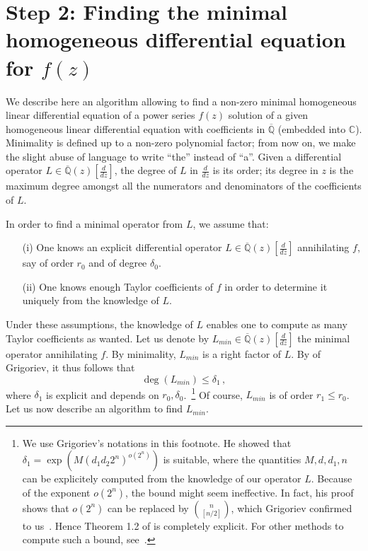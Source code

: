 \documentclass[reqno,english,12pt,a4paper]{smfart}
\numberwithin{equation}{section}
\def\Qbar{\overline{\mathbb Q}}
\begin{document}
\section{Step 2: Finding the minimal homogeneous differential equation for $f(z)$}\label{sec:s2}

We describe here an algorithm allowing to find a  non-zero minimal homogeneous linear differential equation of a 
power series $f(z)$ solution of a given homogeneous linear differential equation with coefficients in $\Qbar$ (embedded into $\mathbb C$). Minimality is defined up to a non-zero polynomial factor; from now on, we make the slight abuse of language to write ``the'' instead of ``a''. Given a differential operator $L \in \Qbar(z)[\frac{d}{dz}]$, the degree of $L$ in $\frac{d}{dz}$ is its order; its degree in $z$ is the maximum degree amongst all the numerators and denominators of the coefficients of $L$. 

In order to find a minimal operator from $L$, we assume that: 

\begin{itemize}

\item[(i)] One knows an explicit differential operator $L\in \Qbar(z)[\frac{d}{dz}]$ annihilating $f$, say 
of order $r_0$ and of degree $\delta_0$. 

\medskip

\item[(ii)] One knows enough Taylor coefficients of $f$ in order to determine it uniquely from the 
knowledge of $L$. 
\end{itemize}

Under these assumptions, the knowledge of $L$ enables one to compute as many Taylor coefficients 
as wanted.  Let us denote by $L_{min}\in \Qbar(z)[\frac{d}{dz}]$ the minimal operator annihilating $f$. 
By minimality, $L_{min}$ is a right factor of $L$.  By \cite[Theorem 1.2]{Gr90} of Grigoriev, 
it thus follows that 
$$
\deg(L_{min})\leq \delta_1 \,,
$$
where $\delta_1$ is explicit and depends on $r_0,\delta_0$.~\footnote{We use Grigoriev's notations \cite{Gr90} in this footnote. He 
showed that 
$\delta_1=\exp(M(d_1d_2 2^n)^{o(2^n)})$ is suitable, where the quantities $M, d, d_1, n$ can be explicitely computed from the knowledge of our operator $L$. Because of the exponent $o(2^n)$, the bound might seem ineffective. In fact, his proof shows that $o(2^n)$ can be replaced 
by $\binom{n}{[n/2]}$, which Grigoriev confirmed to us~\cite{grigpriv}. Hence Theorem 1.2 of \cite{Gr90} is completely explicit. For other methods to compute such a bound, see~\cite[Sec. 9]{hoeij}.} Of course, $L_{min}$ is of order $r_1\leq r_0$.  
Let us now describe an algorithm to find $L_{min}$. 
\end{document}
